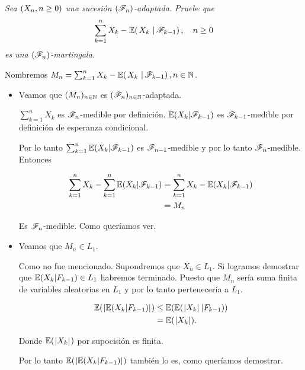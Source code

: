 \emph{
    Sea $\left( X_n,n\geq 0\right) $ una sucesi\'on $\left( \mathscr{F}_n\right) $-adaptada. Pruebe que
    \begin{align}
        \sum_{k=1}^n X_k-\espc{X_k}{\F_{k-1}}, \quad n\geq 0
    \end{align}
    es una $\left( \mathscr{F}_n\right) $-martingala.
}

\afterstatement\par\null

Nombremos $M_n = \sum_{k=1}^n X_k-\espc{X_k}{\F_{k-1}}, n \in \N$.\par\null

\begin{itemize}
	\item 
        Veamos que $(M_n)_{n \in \mathbb{N}}$ es $(\mathscr{F}_n)_{n \in \mathbb{N}}$-adaptada.\par\null
    
        $\sum_{k = 1}^n X_k$ es $\mathscr{F}_n$-medible por definición. $\mathbb{E}(X_k | \mathscr{F}_{k-1})$ es $\mathscr{F}_{k-1}$-medible por definición
        de esperanza condicional. \par\null
        
        Por lo tanto $\sum_{k = 1}^n \mathbb{E}(X_k | \mathscr{F}_{k-1})$ es $\mathscr{F}_{n-1}$-medible y por lo tanto
        $\mathscr{F}_n$-medible. Entonces
        
        \begin{align}
            \sum_{k = 1}^n X_k - \sum_{k = 1}^n \mathbb{E}(X_k | \mathscr{F}_{k-1}) &=  \sum_{k = 1}^n X_k - \mathbb{E}(X_k | \mathscr{F}_{k-1})    \\
                                                                    &=  M_n   
        \end{align}\par\null
    
        Es $\mathscr{F}_n$-medible. Como queríamos ver.\par\null
        
    \item
        Veamos que $M_n \in L_1$.\par\null
        
        Como no fue mencionado. Supondremos que $X_n \in L_1$. Si logramos demostrar que $\mathbb{E}(X_k | F_{k-1}) \in L_1$ habremos terminado.
        Puesto que $M_n$ sería suma finita de variables aleatorias en $L_1$ y por lo tanto pertenecería a $L_1$.\par\null
        
        \begin{align}
            \mathbb{E}(\hspace{.25mm}\left|\mathbb{E}(X_k | F_{k-1})\right|\hspace{.25mm})     &\leq   \mathbb{E}(\mathbb{E}(\hspace{.25mm}\left|X_k\right|\hspace{.25mm} | F_{k-1})) \\
                                            &=      \mathbb{E}(\hspace{.25mm}\left|X_k\right|\hspace{.25mm}). 
        \end{align}
        
        Donde $\mathbb{E}(\hspace{.25mm}\left|X_k\right|\hspace{.25mm})$ por supocisión es finita.\par\null
        
        Por lo tanto $\mathbb{E}(\hspace{.25mm}\left|\mathbb{E}(X_k | F_{k-1})\right|\hspace{.25mm})$ también lo es, como queríamos demostrar.\par\null

\end{itemize}